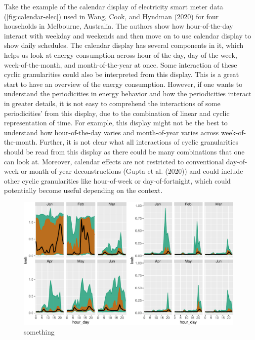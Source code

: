 \documentclass[
]{article}
\begin{document}
\noindent Take the example of the calendar display of electricity smart meter data (\ref{fig:calendar-elec}) used in Wang, Cook, and Hyndman (2020) for four households in Melbourne, Australia. The authors show how hour-of-the-day interact with weekday and weekends and then move on to use calendar display to show daily schedules. The calendar display has several components in it, which helps us look at energy consumption across hour-of-the-day, day-of-the-week, week-of-the-month, and month-of-the-year at once. Some interaction of these cyclic granularities could also be interpreted from this display. This is a great start to have an overview of the energy consumption. However, if one wants to understand the periodicities in energy behavior and how the periodicities interact in greater details, it is not easy to comprehend the interactions of some periodicities' from this display, due to the combination of linear and cyclic representation of time. For example, this display might not be the best to understand how hour-of-the-day varies and month-of-year varies across week-of-the-month. Further, it is not clear what all interactions of cyclic granularities should be read from this display as there could be many combinations that one can look at. Moreover, calendar effects are not restricted to conventional day-of-week or month-of-year deconstructions (Gupta et al. (2020)) and could include other cyclic granularities like hour-of-week or day-of-fortnight, which could potentially become useful depending on the context.

\begin{figure}

{\centering \includegraphics[width=\textwidth]{figure/id2-1} 

}

\caption{something}\label{fig:id2}
\end{figure}
\end{document}
